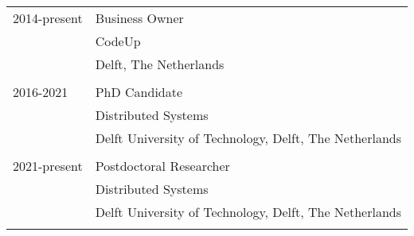 \begin{longtable}{p{} p{}}
    2014-present & Business Owner\\
    & CodeUp\\
    & Delft, The Netherlands\\\\
    
    2016-2021 & PhD Candidate\\
    & Distributed Systems\\
    & Delft University of Technology, Delft, The Netherlands\\\\
    
    2021-present & Postdoctoral Researcher\\
    & Distributed Systems\\
    & Delft University of Technology, Delft, The Netherlands\\\\
\end{longtable}

